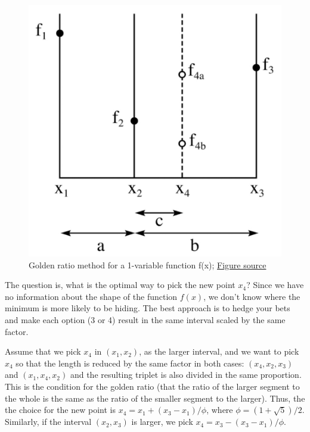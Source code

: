 \documentclass[
  letterpaper,
  DIV=11,
  numbers=noendperiod]{scrreprt}
\begin{document}
\begin{figure}[H]

{\centering \includegraphics{figs/golden_search.png}

}

\caption{Golden ratio method for a 1-variable function f(x);
\href{https://en.wikipedia.org/wiki/Golden-section_search\#/media/File:GoldenSectionSearch.png}{Figure
source}}

\end{figure}%

The question is, what is the optimal way to pick the new point \(x_4\)?
Since we have no information about the shape of the function \(f(x)\),
we don't know where the minimum is more likely to be hiding. The best
approach is to hedge your bets and make each option (3 or 4) result in
the same interval scaled by the same factor.

Assume that we pick \(x_4\) in \((x_1, x_2)\), as the larger interval,
and we want to pick \(x_4\) so that the length is reduced by the same
factor in both cases: \((x_4, x_2, x_3)\) and \((x_1, x_4, x_2)\) and
the resulting triplet is also divided in the same proportion. This is
the condition for the golden ratio (that the ratio of the larger segment
to the whole is the same as the ratio of the smaller segment to the
larger). Thus, the the choice for the new point is
\(x_4 = x_1 + (x_3 - x_1)/\phi\), where \(\phi = (1 + \sqrt 5)/2\).
Similarly, if the interval \((x_2,x_3)\) is larger, we pick
\(x_4 = x_3 - (x_3 - x_1)/\phi\).
\end{document}
